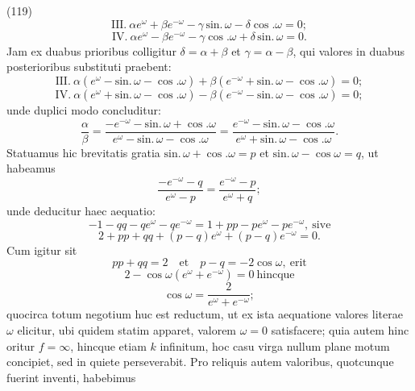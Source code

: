\documentclass[11pt,a4paper]{article}
\begin{document}
(119)
\[
\text{III.}\ \alpha e^{\omega} + \beta e^{-\omega} - \gamma\,\text{sin.}\,\omega - \delta\cos.\omega = 0;
\]
\[
\text{IV.}\ \alpha e^{\omega} - \beta e^{-\omega} - \gamma\cos.\omega + \delta\,\text{sin.}\,\omega = 0.
\]
Jam ex duabus prioribus colligitur $\delta = \alpha + \beta$ et
$\gamma = \alpha - \beta$, qui valores in duabus posterioribus substituti
praebent:
\[
\text{III.}\ \alpha(e^{\omega} - \text{sin.}\,\omega - \cos.\omega) + \beta(e^{-\omega} + \text{sin.}\,\omega - \cos.\omega) = 0;
\]
\[
\text{IV.}\ \alpha(e^{\omega} + \text{sin.}\,\omega - \cos.\omega) - \beta(e^{-\omega} - \text{sin.}\,\omega - \cos.\omega) = 0;
\]
unde duplici modo concluditur:
\[
\frac{\alpha}{\beta} = \frac{-e^{-\omega} - \text{sin.}\,\omega + \cos.\omega}{e^{\omega} - \text{sin.}\,\omega - \cos.\omega}
= \frac{e^{-\omega} - \text{sin.}\,\omega - \cos.\omega}{e^{\omega} + \text{sin.}\,\omega - \cos.\omega}.
\]
Statuamus hic brevitatis gratia $\text{sin.}\,\omega + \cos.\omega = p$ et
$\text{sin.}\,\omega - \cos\omega = q$, ut habeamus
\[
\frac{-e^{-\omega} - q}{e^{\omega} - p} = \frac{e^{-\omega} - p}{e^{\omega} + q};
\]
unde deducitur haec aequatio:
\[
-1 - qq - qe^{\omega} - qe^{-\omega} = 1 + pp - pe^{\omega} - pe^{-\omega}, \ \text{sive}
\]
\[
2 + pp + qq + (p - q)e^{\omega} + (p - q)e^{-\omega} = 0.
\]
Cum igitur sit
\[
pp + qq = 2 \quad\text{et}\quad p - q = -2\cos\omega, \ \text{erit}
\]
\[
2 - \cos\omega(e^{\omega} + e^{-\omega}) = 0 \ \text{hincque}
\]
\[
\cos\omega = \frac{2}{e^{\omega} + e^{-\omega}};
\]
quocirca totum negotium huc est reductum, ut ex ista aequatione valores
literae $\omega$ elicitur, ubi quidem statim apparet, valorem $\omega = 0$
satisfacere; quia autem hinc oritur $f = \infty$, hincque etiam $k$
infinitum, hoc casu virga nullum plane motum concipiet, sed in quiete
perseverabit. Pro reliquis autem valoribus, quotcunque fuerint inventi,
habebimus
\end{document}
